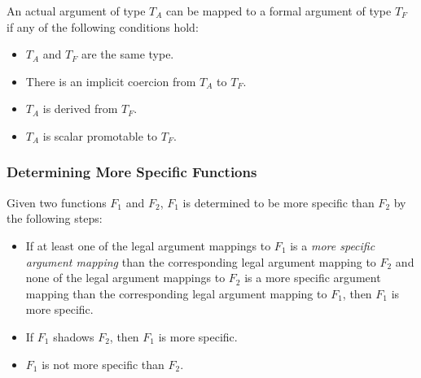An actual argument of type $T_A$ can be mapped to a formal argument of
type $T_F$ if any of the following conditions hold:
\begin{itemize}
\item $T_A$ and $T_F$ are the same type.
\item There is an implicit coercion from $T_A$ to $T_F$.
\item $T_A$ is derived from $T_F$.
\item $T_A$ is scalar promotable to $T_F$.
\end{itemize}

\subsubsection{Determining More Specific Functions}
\label{Determining_More_Specific_Functions}

Given two functions $F_1$ and $F_2$, $F_1$ is determined to be more
specific than $F_2$ by the following steps:
\begin{itemize}
\item
If at least one of the legal argument mappings to $F_1$ is a {\em more
specific argument mapping} than the corresponding legal argument
mapping to $F_2$ and none of the legal argument mappings to $F_2$ is a
more specific argument mapping than the corresponding legal argument
mapping to $F_1$, then $F_1$ is more specific.
\item If $F_1$ shadows $F_2$, then $F_1$ is more specific.
\item $F_1$ is not more specific than $F_2$.
\end{itemize}

